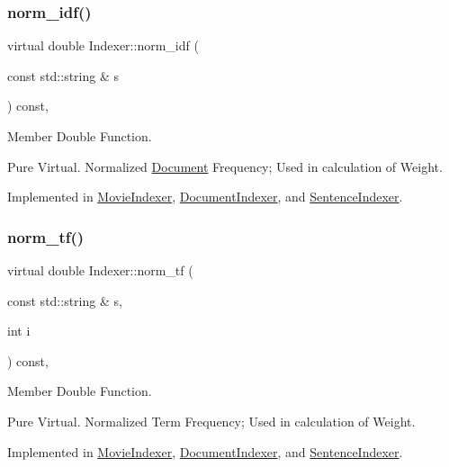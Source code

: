 \subsubsection{\texorpdfstring{norm\+\_\+idf()}{norm\_idf()}}
{\footnotesize\ttfamily virtual double Indexer\+::norm\+\_\+idf (\begin{DoxyParamCaption}\item[{const std\+::string \&}]{s }\end{DoxyParamCaption}) const\hspace{0.3cm}{\ttfamily [protected]}, {}}



Member Double Function. 

Pure Virtual. Normalized \hyperlink{class_document}{Document} Frequency; Used in calculation of Weight. 

Implemented in \hyperlink{class_movie_indexer_a488c038d7aa0b60d5e8192c12f19c33e}{Movie\+Indexer}, \hyperlink{class_document_indexer_a1c366e241572edc6e1d256db906cac43}{Document\+Indexer}, and \hyperlink{class_sentence_indexer_a646014181566f20140cee5dbd16f52fa}{Sentence\+Indexer}.

\mbox{\label{class_indexer_aadcdca40938d27c465e564ac8852f02d}} 
\subsubsection{\texorpdfstring{norm\+\_\+tf()}{norm\_tf()}}
{\footnotesize\ttfamily virtual double Indexer\+::norm\+\_\+tf (\begin{DoxyParamCaption}\item[{const std\+::string \&}]{s,  }\item[{int}]{i }\end{DoxyParamCaption}) const\hspace{0.3cm}{\ttfamily [protected]}, {}}



Member Double Function. 

Pure Virtual. Normalized Term Frequency; Used in calculation of Weight. 

Implemented in \hyperlink{class_movie_indexer_a1ea55cde00e7a8be06eedcff56021de2}{Movie\+Indexer}, \hyperlink{class_document_indexer_a91cbacd5c82134b2ba6ab79e06fa4a60}{Document\+Indexer}, and \hyperlink{class_sentence_indexer_ada837ec334535e133c9ec511b369abfa}{Sentence\+Indexer}.


